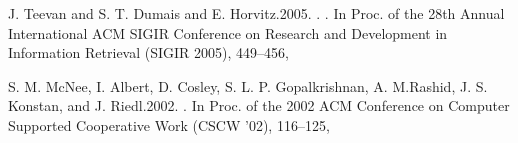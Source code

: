 \begin{thebibliography}{10}
J. Teevan and S. T. Dumais and E. Horvitz.2005.
.
\newblock . In Proc. of the 28th Annual International ACM SIGIR Conference on Research and Development in Information Retrieval (SIGIR 2005), 449–456,

S. M. McNee, I. Albert, D. Cosley, S. L. P. Gopalkrishnan, A. M.Rashid, J. S. Konstan, and J. Riedl.2002.
.
\newblock  In Proc. of the 2002 ACM Conference on Computer Supported Cooperative Work (CSCW ’02), 116–125,
\end{thebibliography}
